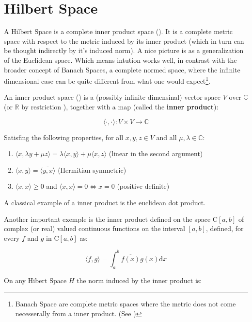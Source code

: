 
\section{Hilbert Space}

A Hilbert Space is a complete inner product space (\citet{HS-YN:11}). It is a
complete metric space with respect to the metric induced by its inner product
(which in turn can be thought indirectly by it's induced norm). A nice picture
is as a generalization of the Euclidean space. Which means intution works well,
in contrast with the broader concept of Banach Spaces, a complete normed space,
where the infinite dimensional case can be quite different from what one would
expect\footnote{Banach Space are complete metric spaces where the metric does
not come necesserally from a inner product. (See \citet{HS-HJNB:00})}.

An inner product space (\citet{HS-HJNB:00}) is a (possibly infinite dimensinal)
vector space $V$ over $\mathbb{C}$ (or $\mathbb{R}$ by restriction ), together
with a map (called the \textbf{inner product}):

\[  \langle\cdot,\cdot\rangle: V \times V \to \mathbb{C} \]

Satisfing the following properties, for all $x,y,z \in V$ and all $\mu, \lambda
\in \mathbb{C}$:

\begin{enumerate}[I]
  \item \(  \langle x,\lambda y + \mu z  \rangle = \lambda\langle	 x,y\rangle +
  \mu \langle x,z \rangle \) (linear in the second argument)
  \item \( \langle x,y \rangle = \overline{\langle y,x \rangle } \) (Hermitian
  symmetric)
  \item  \( \langle x,x \rangle \geq 0 \) and \( \langle x,x \rangle = 0
  \Leftrightarrow x = 0 \) (positive definite)
\end{enumerate}

A classical example of a inner product is the euclidean dot product.

Another important exemple is the inner product defined on the space C$[a,b]$ of
complex (or real) valued continuous functions on the interval $[a,b]$, defined,
for every $f$ and $g$ in C$[a,b]$ as:

\begin{equation}\label{eq::func_inner}
  \langle f,g\rangle = \int_a^b \overline{f(x)}g(x) \mathrm{d}x
\end{equation}

On any Hibert Space $H$ the norm induced by the inner product is:

